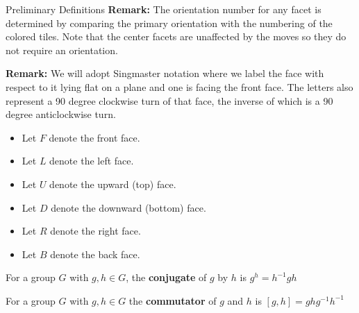 \documentclass[final]{beamer}
\newlength{\colwidth}
\begin{document}
\begin{frame}[t]
\begin{columns}[t]
\begin{column}{\colwidth}
\begin{alertblock}{Preliminary Definitions}
\textbf{Remark:} The orientation number for any facet is determined by comparing the primary orientation with the numbering of the colored tiles. Note that the center facets are unaffected by the moves so they do not require an orientation.

\textbf{Remark:}
We will adopt Singmaster notation where
we label the face with respect to it lying
flat on a plane and one is facing the front face. The letters also represent a 90 degree clockwise turn of that face, the inverse of which is a 90 degree anticlockwise turn.

\begin{itemize}
\item Let $F$ denote the front face.
\item Let $L$ denote the left face.
\item Let $U$ denote the upward (top) face.
\item Let $D$ denote the downward (bottom) face.
\item Let $R$ denote the right face.
\item Let $B$ denote the back face.
\end{itemize}


For a group $G$ with $g,h \in G$, the \textbf{conjugate} of $g$ by $h$ is
$g^h = h^{-1}gh$

For a group $G$ with $g,h \in G$
the \textbf{commutator} of $g$ and $h$ is
$[g,h]=ghg^{-1}h^{-1}$







\end{alertblock}
\end{column}
\end{columns}
\end{frame}
\end{document}
